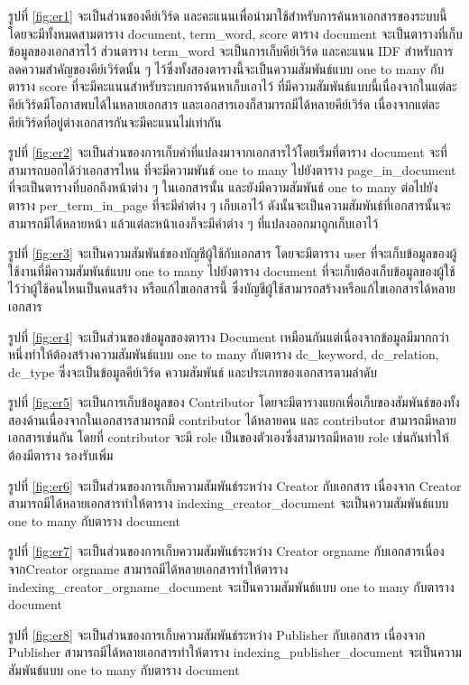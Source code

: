 รูปที่ \ref{fig:er1} จะเป็นส่วนของคีย์เวิร์ด และคะแนนเพื่อนำมาใช้สำหรับการค้นหาเอกสารของระบบนี้ โดยจะมีทั้งหมดสามตาราง document, term\_word, score ตาราง document จะเป็นตารางที่เก็บข้อมูลของเอกสารไว้ ส่วนตาราง term\_word จะเป็นการเก็บคีย์เวิร์ด และคะแนน IDF สำหรับการลดความสำคัญของคีย์เวิร์ดนั้น ๆ ไว้ซึ่งทั้งสองตารางนี้จะเป็นความสัมพันธ์แบบ one to many กับตาราง score ที่จะมีคะแนนสำหรับระบบการค้นหาเก็บเอาไว้ ที่มีความสัมพันธ์แบบนี้เนื่องจากในแต่ละคีย์เวิร์ดมีโอกาสพบได้ในหลายเอกสาร และเอกสารเองก็สามารถมีได้หลายคีย์เวิร์ด เนื่องจากแต่ละคีย์เวิร์ดที่อยู่ต่างเอกสารกันจะมีคะแนนไม่เท่ากัน

รูปที่ \ref{fig:er2} จะเป็นส่วนของการเก็บคำที่แปลงมาจากเอกสารไว้โดยเริ่มที่ตาราง document จะที่สามารถบอกได้ว่าเอกสารไหน ที่จะมีความพันธ์ one to many ไปยังตาราง page\_in\_document ที่จะเป็นตารางที่บอกถึงหน้าต่าง ๆ ในเอกสารนั้น และยังมีความสัมพันธ์ one to many ต่อไปยังตาราง per\_term\_in\_page ที่จะมีคำต่าง ๆ เก็บเอาไว้ ดังนั้นจะเป็นความสัมพันธ์ที่เอกสารนั้นจะสามารถมีได้หลายหน้า แล้วแต่ละหน้าเองก็จะมีคำต่าง ๆ ที่แปลงออกมาถูกเก็บเอาไว้

รูปที่ \ref{fig:er3} จะเป็นความสัมพันธ์ของบัญชีผู้ใช้กับเอกสาร โดยจะมีตาราง user ที่จะเก็บข้อมูลของผู้ใช้งานที่มีความสัมพันธ์แบบ one to many ไปยังตาราง document ที่จะเก็บต้องเก็บข้อมูลของผู้ใช้ไว้ว่าผู้ใช้คนไหนเป็นคนสร้าง หรือแก้ไขเอกสารนี้ ซึ่งบัญชีผู้ใช้สามารถสร้างหรือแก้ไขเอกสารได้หลายเอกสาร

รูปที่ \ref{fig:er4} จะเป็นส่วนของข้อมูลของตาราง Document เหมือนกันแต่เนื่องจากข้อมูลมีมากกว่าหนึ่งทำให้ต้องสร้างความสัมพันธ์แบบ one to many กับตาราง dc\_keyword, dc\_relation, dc\_type ซึ่งจะเป็นข้อมูลคีย์เวิร์ด ความสัมพันธ์ และประเภทของเอกสารตามลำดับ

รูปที่ \ref{fig:er5} จะเป็นการเก็บข้อมูลของ Contributor โดยจะมีตารางแยกเพื่อเก็บของสัมพันธ์ของทั้งสองด้านเนื่องจากในเอกสารสามารถมี contributor ได้หลายคน และ contributor สามารถมีหลายเอกสารเช่นกัน โดยที่ contributor จะมี role เป็นของตัวเองซึ่งสามารถมีหลาย role เช่นกันทำให้ต้องมีตาราง รองรับเพิ่ม

รูปที่ \ref{fig:er6} จะเป็นส่วนของการเก็บความสัมพันธ์ระหว่าง Creator กับเอกสาร เนื่องจาก Creator สามารถมีได้หลายเอกสารทำให้ตาราง indexing\_creator\_document จะเป็นความสัมพันธ์แบบ one to many กับตาราง document 

รูปที่ \ref{fig:er7} จะเป็นส่วนของการเก็บความสัมพันธ์ระหว่าง Creator orgname กับเอกสารเนื่อง จากCreator orgname สามารถมีได้หลายเอกสารทำให้ตาราง indexing\_creator\_orgname\_document จะเป็นความสัมพันธ์แบบ one to many กับตาราง document 

รูปที่ \ref{fig:er8} จะเป็นส่วนของการเก็บความสัมพันธ์ระหว่าง Publisher กับเอกสาร เนื่องจาก Publisher สามารถมีได้หลายเอกสารทำให้ตาราง indexing\_publisher\_document จะเป็นความสัมพันธ์แบบ one to many กับตาราง document 

